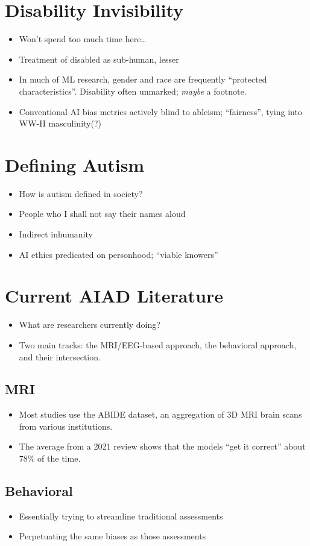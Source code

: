 \documentclass[twoside, letterpaper, twocolumn]{article}
\begin{document}
\section{Disability Invisibility}
\begin{itemize}
    \item Won't spend too much time here\dots
    \item Treatment of disabled as sub-human, lesser
    \item In much of ML research, gender and race are frequently ``protected characteristics''. Disability often unmarked; \textit{maybe} a footnote.
    \item Conventional AI bias metrics actively blind to ableism; ``fairness'', tying into WW-II masculinity(?)
\end{itemize}
\section{Defining Autism}
\begin{itemize}
    \item How is autism defined in society?
    \item People who I shall not say their names aloud
    \item Indirect inhumanity
    \item AI ethics predicated on personhood; ``viable knowers''
\end{itemize}
\section{Current AIAD Literature}
\begin{itemize}
    \item What are researchers currently doing?
    \item Two main tracks: the MRI/EEG-based approach, the behavioral approach, and their intersection.
\end{itemize}
\subsection{MRI}
\begin{itemize}
    \item Most studies use the ABIDE dataset, an aggregation of 3D MRI brain scans from various institutions.
    \item The average from a 2021 review shows that the models ``get it correct'' about 78\% of the time.
\end{itemize}
\subsection{Behavioral}
\begin{itemize}
    \item Essentially trying to streamline traditional assessments
    \item Perpetuating the same biases as those assessments
\end{itemize}
\end{document}
